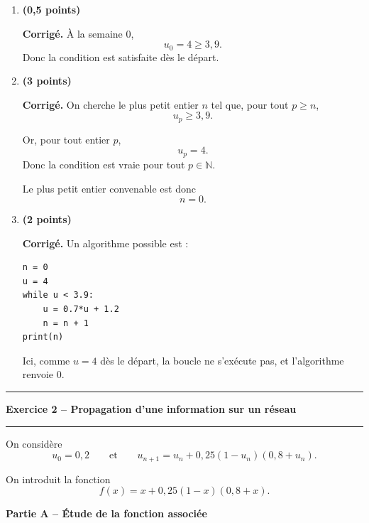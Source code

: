 \documentclass[11pt,a4paper]{article}
\newcommand{\N}{\mathbb{N}}
\newcommand{\bareme}[1]{\hfill{\color{blue!70!black}\textbf{(#1 points)}}}
\newcommand{\corr}{\noindent\textcolor{blue!70!black}{\textbf{Corrigé. }}}
\begin{document}
\begin{enumerate}[label=\textbf{D.\arabic*.}, leftmargin=0.9cm]

\item \bareme{0,5}

\corr À la semaine $0$,
\[
u_0=4\geq 3{,}9.
\]
Donc la condition est satisfaite dès le départ.

\item \bareme{3}

\corr On cherche le plus petit entier $n$ tel que, pour tout $p\geq n$,
\[
u_p\geq 3{,}9.
\]

Or, pour tout entier $p$,
\[
u_p=4.
\]
Donc la condition est vraie pour tout $p\in\N$.

Le plus petit entier convenable est donc
\[
\boxed{n=0.}
\]

\item \bareme{2}

\corr Un algorithme possible est :

\begin{verbatim}
n = 0
u = 4
while u < 3.9:
    u = 0.7*u + 1.2
    n = n + 1
print(n)
\end{verbatim}

Ici, comme $u=4$ dès le départ, la boucle ne s’exécute pas, et l’algorithme renvoie $0$.

\end{enumerate}

\vspace{0.4cm}

\hrule
\vspace{0.4cm}
\begin{center}
    \textbf{\large Exercice 2 -- Propagation d’une information sur un réseau}
\end{center}
\vspace{0.2cm}
\hrule
\vspace{0.3cm}

On considère
\[
u_0=0{,}2
\qquad \text{et} \qquad
u_{n+1}=u_n+0{,}25(1-u_n)(0{,}8+u_n).
\]

On introduit la fonction
\[
f(x)=x+0{,}25(1-x)(0{,}8+x).
\]

\medskip

\textbf{Partie A -- Étude de la fonction associée}
\end{document}
